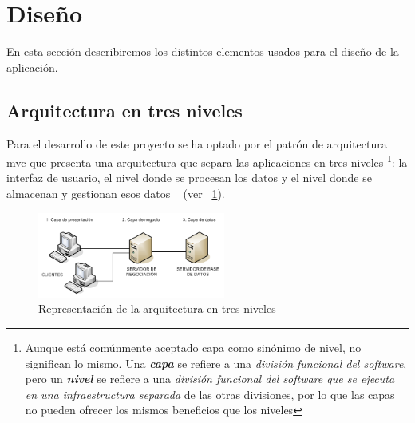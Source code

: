 \section{Diseño}
\label{sec:disenho}

En esta sección describiremos los distintos elementos usados para el diseño de la aplicación.


\subsection{Arquitectura en tres niveles}
\label{sub:arquitectura3niveles}

Para el desarrollo de este proyecto se ha optado por el patrón de arquitectura \acrlong{mvc} que presenta una arquitectura que separa las aplicaciones en tres niveles \footnote{Aunque está comúnmente aceptado capa como sinónimo de nivel, no significan lo mismo. Una \textit{\textbf{capa}} se refiere a una \textit{división funcional del software}, pero un \textit{\textbf{nivel}} se refiere a una \textit{división funcional del software que se ejecuta en una infraestructura separada}  de las otras divisiones, por lo que las capas no pueden ofrecer los mismos beneficios que los niveles}: la interfaz de usuario, el nivel donde se procesan los datos y el nivel donde se almacenan y gestionan esos datos ~\cite{ibmMVC} (ver \figurename~\ref{fig:arquitectura-3-niveles}).

\begin{figure}
  \centering
  \includegraphics[width=0.55\textwidth]{imaxes/arquitectura-3-niveles.png}
  \caption{Representación de la arquitectura en tres niveles}
  \label{fig:arquitectura-3-niveles}
\end{figure}


